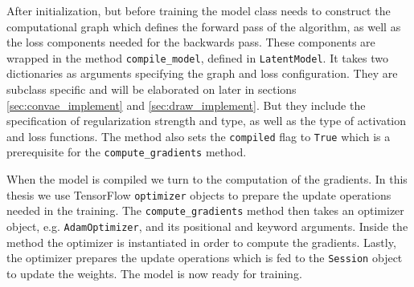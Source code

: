 % 

After initialization, but before training the model class needs to construct the computational graph which defines the forward pass of the algorithm, as well as the loss components needed for the backwards pass. These components are wrapped in the method \lstinline{compile_model}, defined in \lstinline{LatentModel}. It takes two dictionaries as arguments specifying the graph and loss configuration. They are subclass specific and will be elaborated on later in sections \ref{sec:convae_implement} and \ref{sec:draw_implement}. But they include the specification of regularization strength and type, as well as the type of activation and loss functions. The method also sets the \lstinline{compiled} flag to \lstinline{True} which is a prerequisite for the \lstinline{compute_gradients} method.

% 

When the model is compiled we turn to the computation of the gradients. In this thesis we use TensorFlow \lstinline{optimizer} objects to prepare the update operations needed in the training. The \lstinline{compute_gradients} method then takes an optimizer object, e.g. \lstinline{AdamOptimizer}, and its positional and keyword arguments. Inside the method the optimizer is instantiated in order to compute the gradients. Lastly, the optimizer prepares the update operations which is fed to the \lstinline{Session} object to update the weights. The model is now ready for training.


